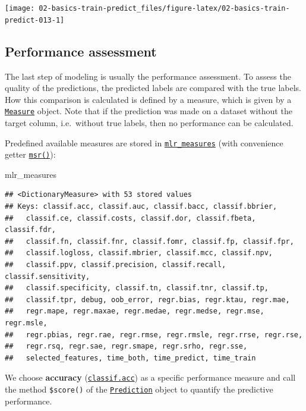 \documentclass[]{scrbook}
\newenvironment{Shaded}{\begin{snugshade}}{\end{snugshade}}
\newcommand{\NormalTok}[1]{#1}
\renewenvironment{Shaded} {\begin{snugshade}\small} {\end{snugshade}}
\begin{document}
\begin{center}\texttt{[image: 02-basics-train-predict\_files/figure-latex/02-basics-train-predict-013-1]} \end{center}

\hypertarget{measure}{%
\subsection{Performance assessment}\label{measure}}

The last step of modeling is usually the performance assessment.
To assess the quality of the predictions, the predicted labels are compared with the true labels.
How this comparison is calculated is defined by a measure, which is given by a \href{https://mlr3.mlr-org.com/reference/Measure.html}{\texttt{Measure}} object.
Note that if the prediction was made on a dataset without the target column, i.e.~without true labels, then no performance can be calculated.

Predefined available measures are stored in \href{https://mlr3.mlr-org.com/reference/mlr_measures.html}{\texttt{mlr\_measures}} (with convenience getter \href{https://mlr3.mlr-org.com/reference/mlr_sugar.html}{\texttt{msr()}}):

\begin{Shaded}
\begin{Highlighting}[]
\NormalTok{mlr_measures}
\end{Highlighting}
\end{Shaded}

\begin{verbatim}
## <DictionaryMeasure> with 53 stored values
## Keys: classif.acc, classif.auc, classif.bacc, classif.bbrier,
##   classif.ce, classif.costs, classif.dor, classif.fbeta, classif.fdr,
##   classif.fn, classif.fnr, classif.fomr, classif.fp, classif.fpr,
##   classif.logloss, classif.mbrier, classif.mcc, classif.npv,
##   classif.ppv, classif.precision, classif.recall, classif.sensitivity,
##   classif.specificity, classif.tn, classif.tnr, classif.tp,
##   classif.tpr, debug, oob_error, regr.bias, regr.ktau, regr.mae,
##   regr.mape, regr.maxae, regr.medae, regr.medse, regr.mse, regr.msle,
##   regr.pbias, regr.rae, regr.rmse, regr.rmsle, regr.rrse, regr.rse,
##   regr.rsq, regr.sae, regr.smape, regr.srho, regr.sse,
##   selected_features, time_both, time_predict, time_train
\end{verbatim}

We choose \textbf{accuracy} (\href{https://mlr3.mlr-org.com/reference/mlr_measures_classif.acc.html}{\texttt{classif.acc}}) as a specific performance measure and call the method \texttt{\$score()} of the \href{https://mlr3.mlr-org.com/reference/Prediction.html}{\texttt{Prediction}} object to quantify the predictive performance.
\end{document}
